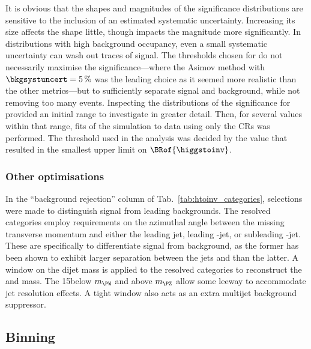 It is obvious that the shapes and magnitudes of the significance distributions are sensitive to the inclusion of an estimated systematic uncertainty. Increasing its size affects the shape little, though impacts the magnitude more significantly. In distributions with high background occupancy, even a small systematic uncertainty can wash out traces of signal. The thresholds chosen for \omegaTilde do not necessarily maximise the significance---where the Asimov method with $\bkgsystuncert = \text{5\,\%}$ was the leading choice as it seemed more realistic than the other metrics---but to sufficiently separate signal and background, while not removing too many events. Inspecting the distributions of the significance for \omegaTilde provided an initial range to investigate in greater detail. Then, for several values within that range, fits of the simulation to data using only the \glspl{CR} was performed. The threshold used in the analysis was decided by the value that resulted in the smallest upper limit on $\BRof{\higgstoinv}$.




\subsubsection{Other optimisations}
\label{subsubsec:htoinv_other_optimisations}

In the ``background rejection'' column of Tab.~\ref{tab:htoinv_categories}, selections were made to distinguish signal from leading backgrounds. The \ttH resolved categories employ requirements on the azimuthal angle between the missing transverse momentum and either the leading jet, leading \Pbottom-jet, or subleading \Pbottom-jet. These are specifically to differentiate \ttH signal from \ttbar background, as the former has been shown to exhibit larger separation between the \glspl{jet} and \ptvecmiss than the latter. A window on the dijet mass is applied to the \VH resolved categories to reconstruct the \PW and \PZ mass. The 15\GeV below $m_{\PW}$ and above $m_{\PZ}$ allow some leeway to accommodate \gls{jet} resolution effects. A tight window also acts as an extra multijet background suppressor.




\subsection{Binning}
\label{subsec:htoinv_binning}

